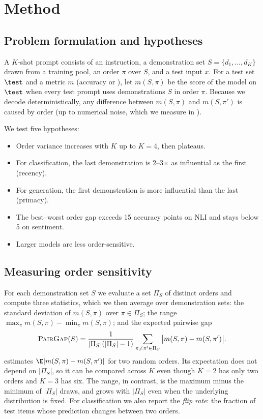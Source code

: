\section{Method}
\label{sec:method}

\subsection{Problem formulation and hypotheses}

A $K$-shot prompt consists of an instruction, a demonstration set $S=\{d_1,\dots,d_K\}$ drawn from a training pool, an order $\pi$ over $S$, and a test input $x$.
For a test set $\test$ and a metric $m$ (accuracy or \rougel), let $m(S,\pi)$ be the score of the model on $\test$ when every test prompt uses demonstrations $S$ in order $\pi$.
Because we decode deterministically, any difference between $m(S,\pi)$ and $m(S,\pi')$ is caused by order (up to numerical noise, which we measure in ).

We test five hypotheses:
\begin{itemize}[leftmargin=*,itemsep=0pt,topsep=0pt]
    \item[\bf H1] Order variance increases with $K$ up to $K=4$, then plateaus.
    \item[\bf H2] For classification, the last demonstration is 2--3$\times$ as influential as the first (recency).
    \item[\bf H3] For generation, the first demonstration is more influential than the last (primacy).
    \item[\bf H4] The best--worst order gap exceeds 15 accuracy points on NLI and stays below 5 on sentiment.
    \item[\bf H5] Larger models are less order-sensitive.
\end{itemize}

\subsection{Measuring order sensitivity}

For each demonstration set $S$ we evaluate a set $\Pi_S$ of distinct orders and compute three statistics, which we then average over demonstration sets: the standard deviation of $m(S,\pi)$ over $\pi\in\Pi_S$; the range $\max_\pi m(S,\pi)-\min_\pi m(S,\pi)$; and the expected pairwise gap
\begin{equation}
\textsc{PairGap}(S) = \frac{1}{|\Pi_S|(|\Pi_S|-1)} \sum_{\pi\neq\pi'\in\Pi_S} \big|m(S,\pi)-m(S,\pi')\big|.
\label{eq:pgap}
\end{equation}
\pgap estimates $\E|m(S,\pi)-m(S,\pi')|$ for two random orders. Its expectation does not depend on $|\Pi_S|$, so it can be compared across $K$ even though $K=2$ has only two orders and $K=3$ has six.
The range, in contrast, is the maximum minus the minimum of $|\Pi_S|$ draws, and grows with $|\Pi_S|$ even when the underlying distribution is fixed.
For classification we also report the \emph{flip rate}: the fraction of test items whose prediction changes between two orders.

